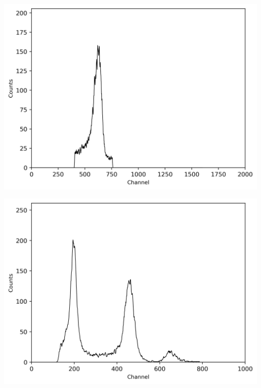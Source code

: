 \begin{multicols}{2}
\begin{center}
\begin{adjustbox}{max width=\linewidth, keepaspectratio}
        \end{adjustbox}
        \label{fig:137CsTPHC60ns}
    \end{center}
\endminipage
%
\vspace{10mm}
%
\minipage{\linewidth}
    \begin{center}
        \captionsetup{type=figure}
        \begin{adjustbox}{max width=\linewidth, keepaspectratio}
            \includegraphics[]{png/137CsTPHC_geschnitten_neu}
        \end{adjustbox}
        \label{fig:137CsTPHC_geschnitten_neu}
    \end{center}
\endminipage
%
\vspace{10mm}
%
\minipage{\linewidth}
    \begin{center}
        \captionsetup{type=figure}
        \begin{adjustbox}{max width=\linewidth, keepaspectratio}
            \includegraphics[]{png/137CsmitTPHC_gated}

\end{adjustbox}
\end{center}
\end{multicols}
